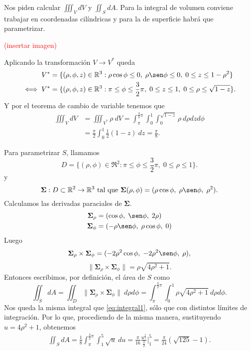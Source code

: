 \begin{solution}
    Nos piden calcular $\iiint_V dV$ y $\iint_S dA$. Para la
    integral de volumen conviene trabajar en coordenadas
    cil\'indricas y para la de superficie habr\'a que parametrizar.

    \textcolor{red}{(insertar imagen)}

    Aplicando la transformaci\'on $V \rightarrow V^*$ queda
    \begin{align*}
        V^*      & =\{(\rho, \phi, z)\in\Re^3: \rho\cos\phi \leq 0,\;
        \rho\sen\phi \leq 0,\; 0 \leq z \leq 1-\rho^2\}               \\
        \iff V^* & =\{(\rho, \phi, z)\in\Re^3: \pi \leq \phi \leq
        \frac{3}{2}\pi,\; 0 \leq z \leq 1,\; 0 \leq \rho \leq
        \sqrt{1-z} \}.
    \end{align*}
    Y por el teorema de cambio de variable tenemos que
    \begin{align*}
        \iiint_V dV & = \iiint_{V^*} \rho\:dV = \int_\pi^{\frac{3}{2}\pi}
        \int_0^1\int_0^{\sqrt{1-z}}\rho\:d\rho dz d\phi                   \\
                    & =\frac{\pi}{2}\int_0^1\frac{1}{2}(1-z)\:dz =
        \frac{\pi}{8}.
    \end{align*}

    Para parametrizar $S$, llamamos
    \[
        D = \{(\rho, \phi)\in\Re^2 : \pi\leq\phi\leq\frac{3}{2}\pi,\;
        0\leq\rho\leq 1\}.
    \]
    y
    \[
        \boldsymbol{\Sigma}:D\subset\Re^2\rightarrow\Re^3\text{ tal que }
        \boldsymbol{\Sigma}(\rho,\phi)=(\rho\cos\phi,\;\rho\sen\phi,\;\rho^2).
    \]
    Calculamos las derivadas paraciales de $\boldsymbol{\Sigma}$.
    \begin{align*}
        \boldsymbol{\Sigma}_{\rho}&=(\cos \phi,\;\sen \phi,\; 2\rho)\\
        \boldsymbol{\Sigma}_\phi&=(  -\rho \sen \phi,\;\rho \cos \phi,\;0)
        \end{align*}
    Luego
    $$
        \boldsymbol{\Sigma}_{\rho} \times\boldsymbol{\Sigma}_\phi =
        (-2\rho^2 \cos\phi  , \;-2\rho^2 \sen \phi, \;\rho),
    $$ 
    $$\|\boldsymbol{\Sigma}_{\rho} \times\boldsymbol{\Sigma}_\phi\|
        = \rho\sqrt{4\rho^2+1}.
    $$ 
    Entonces escribimos, por definici\'on, el \'area de $S$ como
    \[
        \iint_S dA = \iint_D \| \boldsymbol{\Sigma}_{\rho}
        \times\boldsymbol{\Sigma}_\phi\|\:d\rho d\phi = \int_\pi^{\frac{3}{2}\pi}\int_0^1\rho\sqrt{4\rho^2+1}\:d\rho d\phi.
    \]
    Nos queda la misma integral que \eqref{eq:integral1}, s\'olo que con distintos l\'imites de integraci\'on. Por lo que, procediendo de la misma manera, sustituyendo $u = 4\rho^2+1$, obtenemos
    \begin{gather*}
        \iint_S dA =
        \frac{1}{8}\int_\pi^{\frac{3}{2}\pi}\int_1^5\sqrt{u}\:du =
        \frac{\pi}{16}\frac{u^{\frac{3}{2}}}{\frac{3}{2}}\Bigg\lvert_1^5 =
        \frac{\pi}{24}(\sqrt{125}-1).
    \end{gather*}
\end{solution}

